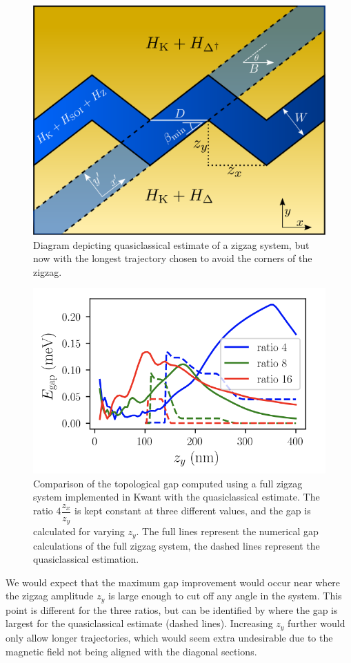 			\begin{figure}
			\centering
			\includegraphics[width=0.45\columnwidth]{images/longest_trajectory_wo_corners}
			\caption{Diagram depicting quasiclassical estimate of a zigzag system, but now with the longest trajectory chosen to avoid the corners of the zigzag.}
			\label{fig:quasiclassical_approximation}
			\end{figure}

			\begin{figure}[!htb]
			\centering
			\includegraphics[width=0.95\columnwidth]{figures/quasiclassical_approximation}
			\caption{Comparison of the topological gap computed using a full zigzag system implemented in Kwant with the quasiclassical estimate. The ratio $4\dfrac{z_x}{z_y}$ is kept constant at three different values, and the gap is calculated for varying $z_y$.
			The full lines represent  the numerical gap calculations of the full zigzag system, the dashed lines represent the quasiclassical estimation.}
			\label{fig:quasiclassical_approximation}
			\end{figure}


			We would expect that the maximum gap improvement would occur near where the zigzag amplitude $z_y$ is large enough to cut off any angle in the system.
			This point is different for the three ratios, but can be identified by where the gap is largest for the quasiclassical estimate (dashed lines).
			Increasing $z_y$ further would only allow longer trajectories, which would seem extra undesirable due to the magnetic field not being aligned with the diagonal sections.
			
